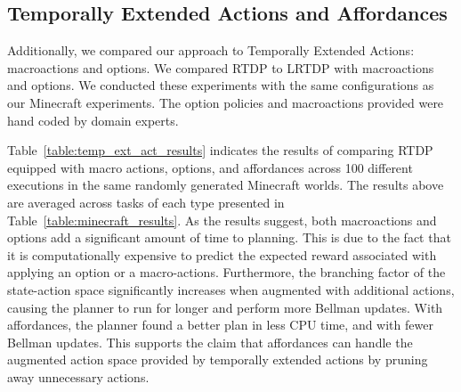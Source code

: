 \documentclass[letterpaper]{article}
\begin{document}


\subsection{Temporally Extended Actions and Affordances}
Additionally, we compared our approach to Temporally Extended Actions: 
macroactions and options. We compared RTDP  to LRTDP with 
macroactions and options. We conducted these experiments 
with the same configurations as our Minecraft experiments. The option policies
and macroactions provided were hand coded by domain experts.

Table~\ref{table:temp_ext_act_results} indicates the results of comparing RTDP
equipped with macro actions, options, and affordances across 100 different executions
in the same randomly generated Minecraft worlds. The results above are averaged across tasks of
each type presented in Table~\ref{table:minecraft_results}. As the results 
suggest, both macroactions and options add a significant amount of time to planning.
This is due to the fact that it is computationally expensive to predict the expected reward
associated with applying an option or a macro-actions. Furthermore, the branching factor of the
state-action space significantly increases when augmented with additional actions, causing the
planner to run for longer and perform more Bellman updates. With affordances, the planner found a better plan
in less CPU time, and with fewer Bellman updates. This supports the claim that affordances can handle the augmented 
action space provided by temporally extended actions by pruning away unnecessary actions.
\end{document}
